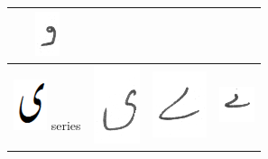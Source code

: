\documentclass[a4paper,conference]{IEEEtran}
\begin{document}
\begin{table}[h]
\begin{tabular}{@{}cccc@{}}
\includegraphics[scale=0.15]{215} \\
\hline
\includegraphics[scale=0.15]{choti_ye_orig} series & \includegraphics[scale=0.15]{216} & \includegraphics[scale=0.15]{217} & 
\includegraphics[scale=0.15]{218} \\
\hline
\end{tabular}
\end{table}




\end{document}
